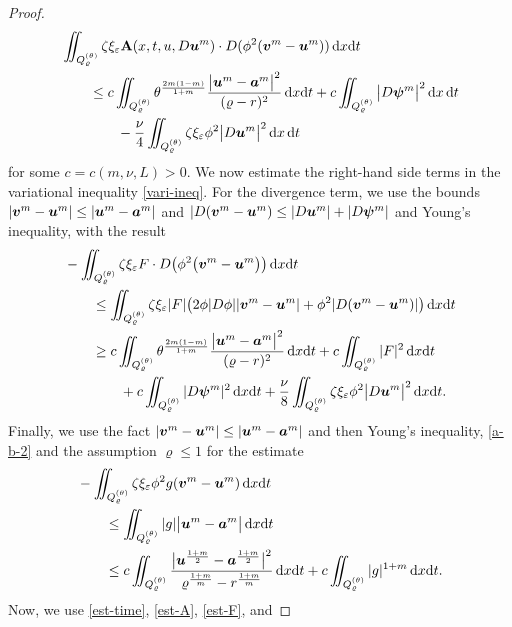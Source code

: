 \documentclass[a4paper, 10pt, american]{amsart}
\numberwithin{theorem}{section}
\numberwithin{equation}{section}
\newcommand{\A}[0]{\ensuremath{\mathbf{A}(x,t,u,D\power um)}}
\newcommand{\dxdt}{\,\mathrm{d}x\mathrm{d}t}
\newcommand{\dx}{\,\mathrm{d}x}
\newcommand{\dt}{\,\mathrm{d}t}
\renewcommand{\rho}{\varrho}
\newcommand{\power}[2]{\bm{#1^{\mbox{\unboldmath{\scriptsize$#2$}}}}}
\begin{document}
\begin{proof}
\begin{align}
&\iint_{Q_\rho^{(\theta)}} \zeta\xi_\varepsilon \A \cdot
D(\phi^2(\power vm-\power um)) \dxdt \\\nonumber
& \qquad \le c\iint_{Q_\rho^{(\theta)}} 
	   \theta^{\frac{2m(1-m)}{1+m}}\frac{ \big|\power u{m}-\power a{m}\big|^2}{(\rho-r)^2} \dxdt
	+ c \iint_{Q_\rho^{(\theta)}} \big|D\power\psi{m}\big|^2 \dx\dt \\\nonumber
&\qquad\qquad	-\frac{\nu}{4} \iint_{Q_\rho^{(\theta)}} 
	 \zeta \xi_\varepsilon  \phi^2 \big|D\power u{m}\big|^2 \dx\dt
\end{align}
for some $c=c(m,\nu,L)>0.$
We now estimate the right-hand side terms in the variational
inequality \eqref{vari-ineq}. For the divergence term, we use the
bounds $|\power vm-\power um|\le|\power um-\power am|$ and $|D(\power
vm-\power um)\le |D\power um|+|D\power\psi m|$ and Young's inequality,
with the result 
\begin{align}\label{est-F}
\nonumber
&-\iint_{Q_{\rho}^{(\theta)}} \zeta\xi_\varepsilon  F \cdot
D\big(\phi^2 \big(\power vm-\power um\big)\big) \dxdt \\\nonumber
&\qquad\le 
\iint_{Q_{\rho}^{(\theta)}} \zeta\xi_\varepsilon  |F|
\big(2\phi |D\phi||\power vm-\power um|+\phi^2|D(\power vm-\power um)|\big) \dxdt\\\nonumber
&\qquad\ge
	c \iint_{Q_{\rho}^{(\theta)}}
        \theta^{\frac{2m(1-m)}{1+m}}\frac{\big|\power u{m}-\power a{m}\big|^{2}}{(\rho-r)^2} \dxdt 
	+ c \iint_{Q_{\rho}^{(\theta)}} |F|^{2}\dxdt \\
	&\qquad\qquad
	+ c \iint_{Q_{\rho}^{(\theta)}} |D\power\psi m|^{2}\dxdt
        +\frac{\nu}{8}
	\iint_{Q_{\rho}^{(\theta)}} 
	 \zeta \xi_\varepsilon\phi^2 \big|D\power u{m}\big|^2 \dxdt.
\end{align}
Finally, we use the fact $|\power vm-\power um|\le|\power um-\power
am|$ and then Young's inequality, \eqref{a-b-2} and the assumption
$\rho\le1$ for the estimate
\begin{align}\label{est-g}
\nonumber
 &-\iint_{Q_{\rho}^{(\theta)}} \zeta\xi_\varepsilon \phi^2 g (\power
vm-\power um) \dxdt 
\\\nonumber
&\qquad\le \iint_{Q_{\rho}^{(\theta)}} |g| \big|\power um-\power am\big| \dxdt \\
& \qquad \le c \iint_{Q_{\rho}^{(\theta)}} \frac{\big|\power u{\frac{1+m}2}-\power a{\frac{1+m}2}\big|^2}{\rho^{\frac{1+m}m}-r^{\frac{1+m}m}} \dxdt
+c \iint_{Q_{\rho}^{(\theta)}}  |g|^{1+m} \dxdt.
\end{align} 
Now, we use \eqref{est-time}, \eqref{est-A}, \eqref{est-F}, and

\end{proof}
\end{document}
